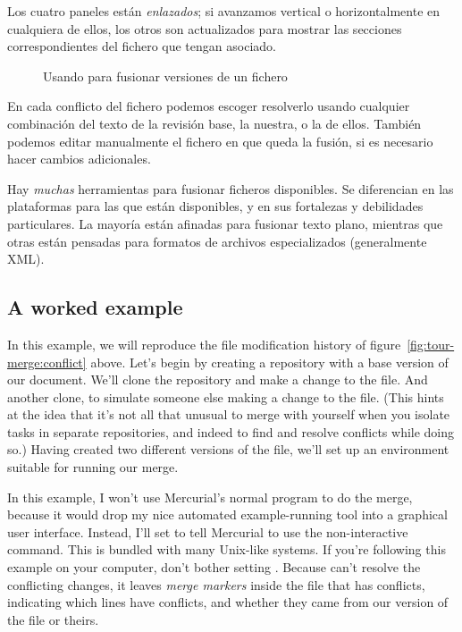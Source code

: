 Los cuatro paneles están \emph{enlazados}; si avanzamos vertical o
horizontalmente en cualquiera de ellos, los otros son actualizados
para mostrar las secciones correspondientes del fichero que tengan
asociado.

\begin{figure}[ht]
  \centering
  \caption{Usando  para fusionar versiones de un
  fichero}
  \label{fig:tour-merge:kdiff3}
\end{figure}

En cada conflicto del fichero podemos escoger resolverlo usando
cualquier combinación del texto de la revisión base, la nuestra, o la
de ellos. También podemos editar manualmente el fichero en que queda
la fusión, si es necesario hacer cambios adicionales.

Hay \emph{muchas} herramientas para fusionar ficheros disponibles. Se
diferencian en las plataformas para las que están disponibles, y en
sus fortalezas y debilidades particulares. La mayoría están afinadas
para fusionar texto plano, mientras que otras están pensadas para
formatos de archivos especializados (generalmente XML).

\subsection{A worked example}

In this example, we will reproduce the file modification history of
figure~\ref{fig:tour-merge:conflict} above.  Let's begin by creating a
repository with a base version of our document.
We'll clone the repository and make a change to the file.
And another clone, to simulate someone else making a change to the
file.  (This hints at the idea that it's not all that unusual to merge
with yourself when you isolate tasks in separate repositories, and
indeed to find and resolve conflicts while doing so.)
Having created two different versions of the file, we'll set up an
environment suitable for running our merge.

In this example, I won't use Mercurial's normal 
program to do the merge, because it would drop my nice automated
example-running tool into a graphical user interface.  Instead, I'll
set  to tell Mercurial to use the non-interactive
 command.  This is bundled with many Unix-like systems.
If you're following this example on your computer, don't bother
setting .
Because  can't resolve the conflicting changes, it
leaves \emph{merge markers} inside the file that has conflicts,
indicating which lines have conflicts, and whether they came from our
version of the file or theirs.

